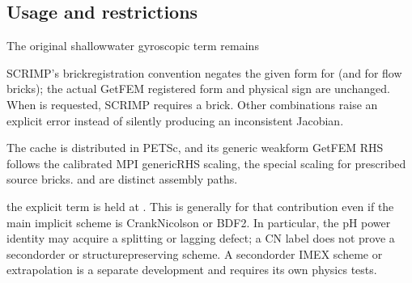 \documentclass[letterpaper,10pt,english]{sphinxmanual}
\begin{document}
\subsection{Usage and restrictions}
\label{\detokenize{explicit_bricks:usage-and-restrictions}}
\sphinxAtStartPar
The original shallow\sphinxhyphen{}water gyroscopic term remains

\begin{sphinxVerbatim}[commandchars=\\\{\}]
      \PYG{p}{[}\PYG{p}{]}
      
\end{sphinxVerbatim}

\sphinxAtStartPar
SCRIMP’s brick\sphinxhyphen{}registration convention negates the given form
for  (and for flow bricks); the actual GetFEM
registered form and physical sign are unchanged. When
 is requested, SCRIMP requires a  brick. Other combinations raise an
explicit error instead of silently producing an inconsistent
Jacobian.

\sphinxAtStartPar
The cache is distributed in PETSc, and its generic weak\sphinxhyphen{}form
GetFEM RHS follows the calibrated MPI generic\sphinxhyphen{}RHS scaling,
 the special scaling for prescribed source bricks.
 and  are distinct assembly
paths.

\sphinxAtStartPar
{} the explicit term is held at
. This is generally 
for that contribution even if the main implicit scheme is
Crank\textendash{}Nicolson or BDF2. In particular, the pH power identity
may acquire a splitting or lagging defect; a CN label does
not prove a second\sphinxhyphen{}order or structure\sphinxhyphen{}preserving 
scheme. A second\sphinxhyphen{}order IMEX scheme or extrapolation is a
separate development and requires its own physics tests.
\end{document}
